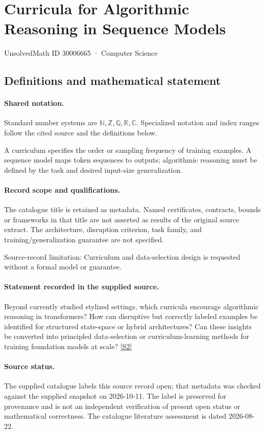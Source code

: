 \documentclass[11pt]{article}
\newcommand{\sref}[2]{\hyperlink{source:#1:#2}{[S#2]}}
\begin{document}
\setcounter{section}{30006664}
\section{Curricula for Algorithmic Reasoning in Sequence Models}\label{30006665}
{\small\sffamily UnsolvedMath ID 30006665 · Computer Science}
\subsection{Definitions and mathematical statement}

\paragraph{Shared notation.}Standard number systems are $\mathbb N,\mathbb Z,\mathbb Q,\mathbb R,\mathbb C$. Specialized notation and index ranges follow the cited source and the definitions below.


A curriculum specifies the order or sampling frequency of training examples. A sequence model maps token sequences to outputs; algorithmic reasoning must be defined by the task and desired input-size generalization.
\paragraph{Record scope and qualifications.}
The catalogue title is retained as metadata. Named certificates, contracts, bounds or frameworks in that title are not asserted as results of the original source extract.
The architecture, disruption criterion, task family, and training/generalization guarantee are not specified.

Source-record limitation: Curriculum and data-selection design is requested without a formal model or guarantee.
\paragraph{Statement recorded in the supplied source.}
Beyond currently studied stylized settings, which curricula encourage algorithmic reasoning in transformers? How can disruptive but correctly labeled examples be identified for structured state-space or hybrid architectures? Can these insights be converted into principled data-selection or curriculum-learning methods for training foundation models at scale? \sref{30006665}{2}
\paragraph{Source status.}
The supplied catalogue labels this source record open; that metadata was checked against the supplied snapshot on 2026-10-11. The label is preserved for provenance and is not an independent verification of present open status or mathematical correctness. The catalogue literature assessment is dated 2026-08-22.
\end{document}
